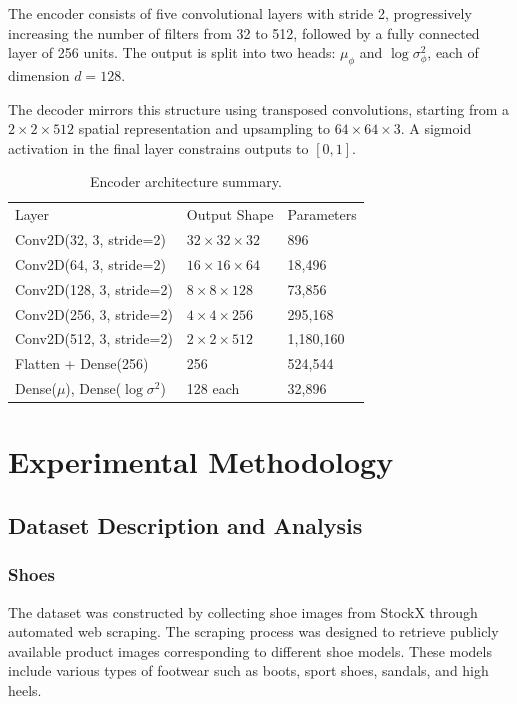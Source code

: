 \documentclass[11pt,a4paper]{article}
\begin{document}
The encoder consists of five convolutional layers with stride 2, progressively increasing the number of filters from 32 to 512, followed by a fully connected layer of 256 units. The output is split into two heads: $\mu_\phi$ and $\log \sigma^2_\phi$, each of dimension $d = 128$.

The decoder mirrors this structure using transposed convolutions, starting from a $2 \times 2 \times 512$ spatial representation and upsampling to $64 \times 64 \times 3$. A sigmoid activation in the final layer constrains outputs to $[0,1]$.

\begin{table}[h]
\centering
\caption{Encoder architecture summary.}
\begin{tabular}{lll}
Layer & Output Shape & Parameters \\
Conv2D(32, 3, stride=2) & $32 \times 32 \times 32$ & 896 \\
Conv2D(64, 3, stride=2) & $16 \times 16 \times 64$ & 18,496 \\
Conv2D(128, 3, stride=2) & $8 \times 8 \times 128$ & 73,856 \\
Conv2D(256, 3, stride=2) & $4 \times 4 \times 256$ & 295,168 \\
Conv2D(512, 3, stride=2) & $2 \times 2 \times 512$ & 1,180,160 \\
Flatten + Dense(256) & 256 & 524,544 \\
Dense($\mu$), Dense($\log\sigma^2$) & 128 each & 32,896 \\
\end{tabular}
\end{table}


\section{Experimental Methodology}

\subsection{Dataset Description and Analysis}
\subsubsection{Shoes}

The dataset was constructed by collecting shoe images from StockX through automated web scraping. The scraping process was designed to retrieve publicly available product images corresponding to different shoe models. These models include various types of footwear such as boots, sport shoes, sandals, and high heels.
\end{document}
